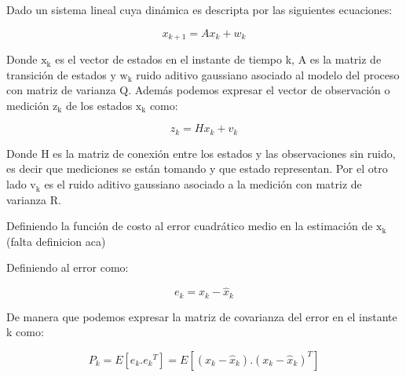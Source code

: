 \documentclass[10pt,a4paper]{article}
\begin{document}
	\noindent Dado un sistema lineal cuya dinámica es descripta por las 
    siguientes ecuaciones:
	
	\begin{figure}[h!]
		\begin{center}
			\begin{equation}
				x_{k+1}= Ax_{k} + w_{k}
				\label{KF_equation01}
			\end{equation}	
		\end{center}
	\end{figure}
	
    \noindent Donde $\mathrm{x_{k}}$ es el vector de estados en el instante de 
    tiempo k, A es la matriz de transición de estados y $\mathrm{w_{k}}$ ruido 
    aditivo gaussiano asociado al modelo del proceso con matriz de varianza Q. 
    Además podemos expresar el vector de observación o medición $\mathrm{z_{k}}$ 
    de los estados $\mathrm{x_{k}}$ como:
	
	\begin{figure}[h!]
		\begin{center}
			\begin{equation}
				z_{k}= Hx_{k} + v_{k}
				\label{KF_equation02}
			\end{equation}	
		\end{center}
	\end{figure}
	
	\noindent Donde H es la matriz de conexión entre los estados y las 
    observaciones sin ruido, es decir que mediciones se están tomando y que 
    estado representan. Por el otro lado $\mathrm{v_{k}}$ es el ruido aditivo 
    gaussiano asociado a la medición con matriz de varianza R.
	
	\noindent Definiendo la función de costo al error cuadrático medio en la 
    estimación de $\mathrm{x_k}$ (falta definicion aca)
	
	\noindent Definiendo al error como: 
	
	\begin{figure}[h!]
		\begin{center}
			\begin{equation}
				e_{k} = x_k  - \hat{x}_k
				\label{KF_error}
			\end{equation}	
		\end{center}
	\end{figure}
	
	\noindent De manera que podemos expresar la matriz de covarianza del error 
    en el instante k como:
	
	\begin{figure}[h!]
		\begin{center}
			\begin{equation}
				P_{k} = E[e_k.{e_k}^{T}] = E[(x_k-\hat{x}_k).(x_k-\hat{x}_k)^{T}]
				\label{KF_equation03}
			\end{equation}	
		\end{center}
	\end{figure}
	
\end{document}

